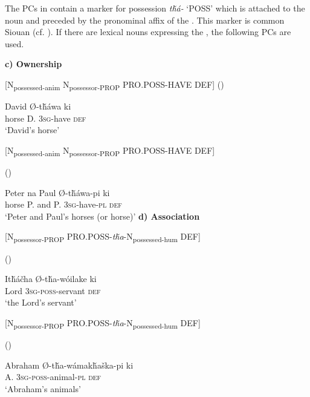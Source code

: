 \documentclass[output=paper]{LSP/langsci}
\begin{document}
The PCs in  contain a marker for possession \textit{t\v{h}á-} `POSS' which is attached to the  noun and preceded by the pronominal affix of the . This marker is common Siouan (cf. \citealt{RankinEtAl2015AccessMay}). If there are lexical nouns expressing the , the following PCs are used.

\vspace{1em}
\textbf{c)	Ownership}

[N\textsubscript{possessed-anim} N\textsubscript{possessor-PROP} PRO.POSS-HAVE DEF] 
\ea	{} (\citealt[91]{Buechel1939}) \label{lakotadavidshorse}

   David   Ø-t\v{h}áwa    ki \\
horse      D.   \textsc{3sg}-have  \textsc{def} \\
\glt `David's horse'
\z

[N\textsubscript{possessed-anim} N\textsubscript{possessor-PROP} PRO.POSS-HAVE DEF]

\ea {} (\citealt[91]{Buechel1939})

 Peter  na  Paul   Ø-t\v{h}áwa-pi     ki  \\
horse    P.       and P.      \textsc{3sg}-have-\textsc{pl} \textsc{def} \\
\glt `Peter and Paul's horses (or horse)'
\z
\textbf{d)	Association}

[N\textsubscript{possessor-PROP} PRO.POSS-\textit{t\v{h}a}-N\textsubscript{possessed-hum} DEF]

\ea	{} (\citealt[92]{Buechel1939})

\gll It\v{h}\'a\v{c}ha    Ø-t\v{h}a-wóilake   ki  \\
Lord   \textsc{3sg-poss}-servant   \textsc{def} \\
\glt `the Lord's servant'
\z

[N\textsubscript{possessor-PROP} PRO.POSS-\textit{t\v{h}a}-N\textsubscript{possessed-hum} DEF]

\ea	{} (\citealt[92]{Buechel1939}) \label{lakotaabraham}

\gll Abraham Ø-t\v{h}a-w\'amak\v{h}a\v{s}ka-pi ki  \\
 A. \textsc{3sg-poss}-animal-\textsc{pl}  \textsc{def} \\
\glt `Abraham's animals'
\z
\end{document}
